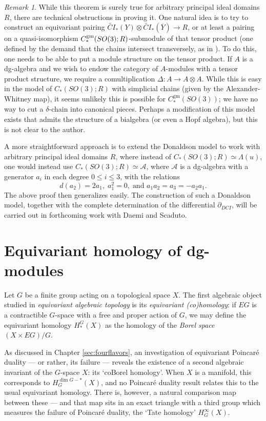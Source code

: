 \documentclass{memo-l}
\theoremstyle{definition}
\theoremstyle{remark}
\newtheorem{remark}[theorem]{Remark}
\numberwithin{section}{chapter}
\numberwithin{equation}{chapter}
\begin{document}
\begin{remark}While this theorem is surely true for arbitrary principal ideal domains $R$, there are technical obstructions in proving it. One natural idea is to try to construct an equivariant pairing $\widetilde{CI}_*(Y) \otimes \widetilde{CI}_*(\overline Y) \to R$, or at least a pairing on a quasi-isomorphism $C_*^{\textup{gm}}(SO(3);R)$-submodule of that tensor product (one defined by the demand that the chains intersect transversely, as in \cite{McClure}). To do this, one needs to be able to put a module structure on the tensor product. If $A$ is a dg-algebra and we wish to endow the category of $A$-modules with a tensor product structure, we require a comultiplication $\Delta: A \to A \otimes A$. While this is easy in the model of $C_*(SO(3);R)$ with simplicial chains (given by the Alexander-Whitney map), it seems unlikely this is possible for $C_*^{\text{gm}}(SO(3))$; we have no way to cut a $\delta$-chain into canonical pieces. Perhaps a modification of this model exists that admits the structure of a bialgebra (or even a Hopf algebra), but this is not clear to the author.

A more straightforward approach is to extend the Donaldson model to work with arbitrary principal ideal domains $R$, where instead of $C_*(SO(3);R) \simeq \Lambda(u)$, one would instead use $C_*(SO(3);R) \simeq \mathcal A$, where $\mathcal A$ is a dg-algebra with a generator $a_i$ in each degree $0 \leq i \leq 3$, with the relations $$d(a_2) = 2a_1,\; a_1^2 = 0,\;\text{and } a_1a_2 = a_3 = -a_2 a_1.$$ The above proof then generalizes easily. The construction of such a Donaldson model, together with the complete determination of the differential $\partial_{DCI}$, will be carried out in forthcoming work with Daemi and Scaduto.
\end{remark}
\appendix

\chapter{Equivariant homology of dg-modules}
Let $G$ be a finite group acting on a topological space $X$. The first algebraic object studied in \emph{equivariant algebraic topology} is its \textit{equivariant (co)homology}: if $EG$ is a contractible $G$-space with a free and proper action of $G$, we may define the equivariant homology $H_*^G(X)$ as the homology of the \textit{Borel space} $(X \times EG)/G$.

As discussed in Chapter \ref{sec:fourflavors}, an investigation of equivariant Poincar\'e duality --- or rather, its failure --- reveals the existence of a second algebraic invariant of the $G$-space $X$: its `coBorel homology'. When $X$ is a manifold, this corresponds to $H^{\dim G - *}_G(X)$, and no Poincar\'e duality result relates this to the usual equivariant homology. There is, however, a natural comparison map between these --- and that map sits in an exact triangle with a third group which measures the failure of Poincar\'e duality, the `Tate homology' $H^\infty_G(X)$. 
\end{document}

